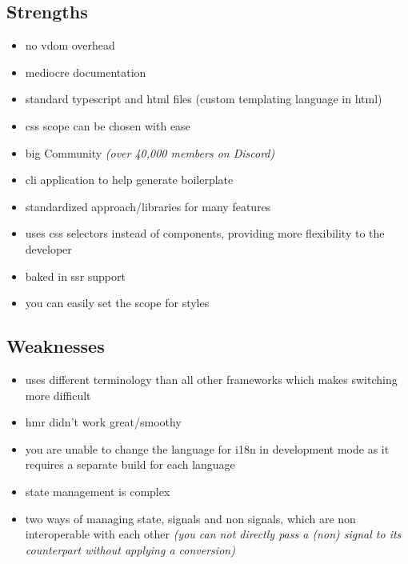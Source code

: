 \subsection{Strengths}
\label{subsec:angular:strengths}
\begin{itemize}
    \item no \acrshort{vdom} overhead
    \item mediocre documentation
    \item standard typescript and \acrshort{html} files (custom templating language in \acrshort{html})
    \item \acrshort{css} scope can be chosen with ease
    \item big Community \textit{(over 40,000 members on Discord)}
    \item \acrshort{cli} application to help generate boilerplate
    \item standardized approach/libraries for many features
    \item uses \acrshort{css} selectors instead of components, providing more flexibility to the developer
    \item baked in \acrshort{ssr} support
    \item you can easily set the scope for styles
\end{itemize}

\subsection{Weaknesses}
\label{subsec:angular:weaknesses}
\begin{itemize}
    \item uses different terminology than all other frameworks which makes switching more difficult
    \item \acrshort{hmr} didn't work great/smoothy
    \item you are unable to change the language for \acrshort{i18n} in development mode as it requires a separate build for each language
    \item state management is complex
    \item two ways of managing state, signals and non signals, which are non interoperable with each other \textit{(you can not directly pass a (non) signal to its counterpart without applying a conversion)}
\end{itemize}